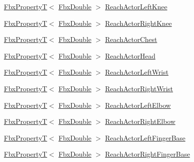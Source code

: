 \begin{DoxyCompactItemize}
\item 
\hyperlink{class_fbx_property_t}{Fbx\+PropertyT}$<$ \hyperlink{fbxtypes_8h_a171e72a1c46fc15c1a6c9c31948c1c5b}{Fbx\+Double} $>$ \hyperlink{class_fbx_character_a85b9f4a0d55767c0af58118459e97129}{Reach\+Actor\+Left\+Knee}
\item 
\hyperlink{class_fbx_property_t}{Fbx\+PropertyT}$<$ \hyperlink{fbxtypes_8h_a171e72a1c46fc15c1a6c9c31948c1c5b}{Fbx\+Double} $>$ \hyperlink{class_fbx_character_a6d6fa21a105a213580ce1e578a6ae1b0}{Reach\+Actor\+Right\+Knee}
\item 
\hyperlink{class_fbx_property_t}{Fbx\+PropertyT}$<$ \hyperlink{fbxtypes_8h_a171e72a1c46fc15c1a6c9c31948c1c5b}{Fbx\+Double} $>$ \hyperlink{class_fbx_character_ad89af6652b384959dbd29e34290bb3fd}{Reach\+Actor\+Chest}
\item 
\hyperlink{class_fbx_property_t}{Fbx\+PropertyT}$<$ \hyperlink{fbxtypes_8h_a171e72a1c46fc15c1a6c9c31948c1c5b}{Fbx\+Double} $>$ \hyperlink{class_fbx_character_abeb245801df829149e54ee3b291a79d4}{Reach\+Actor\+Head}
\item 
\hyperlink{class_fbx_property_t}{Fbx\+PropertyT}$<$ \hyperlink{fbxtypes_8h_a171e72a1c46fc15c1a6c9c31948c1c5b}{Fbx\+Double} $>$ \hyperlink{class_fbx_character_ae5118a968608a6c1a7b786e978583cee}{Reach\+Actor\+Left\+Wrist}
\item 
\hyperlink{class_fbx_property_t}{Fbx\+PropertyT}$<$ \hyperlink{fbxtypes_8h_a171e72a1c46fc15c1a6c9c31948c1c5b}{Fbx\+Double} $>$ \hyperlink{class_fbx_character_a8bf40a85f0b1f63db3b4b35f8f753d81}{Reach\+Actor\+Right\+Wrist}
\item 
\hyperlink{class_fbx_property_t}{Fbx\+PropertyT}$<$ \hyperlink{fbxtypes_8h_a171e72a1c46fc15c1a6c9c31948c1c5b}{Fbx\+Double} $>$ \hyperlink{class_fbx_character_aa87b8af4ec39d88b0fe5ff69c1a9072f}{Reach\+Actor\+Left\+Elbow}
\item 
\hyperlink{class_fbx_property_t}{Fbx\+PropertyT}$<$ \hyperlink{fbxtypes_8h_a171e72a1c46fc15c1a6c9c31948c1c5b}{Fbx\+Double} $>$ \hyperlink{class_fbx_character_aef8163beb5ed38d2f8124f4b9de948c5}{Reach\+Actor\+Right\+Elbow}
\item 
\hyperlink{class_fbx_property_t}{Fbx\+PropertyT}$<$ \hyperlink{fbxtypes_8h_a171e72a1c46fc15c1a6c9c31948c1c5b}{Fbx\+Double} $>$ \hyperlink{class_fbx_character_a7e5392f3362125d4af59a89641f7dd5f}{Reach\+Actor\+Left\+Finger\+Base}
\item 
\hyperlink{class_fbx_property_t}{Fbx\+PropertyT}$<$ \hyperlink{fbxtypes_8h_a171e72a1c46fc15c1a6c9c31948c1c5b}{Fbx\+Double} $>$ \hyperlink{class_fbx_character_af3fcc1f9148d9612c3b3a2b8bcb60a3d}{Reach\+Actor\+Right\+Finger\+Base}

\end{DoxyCompactItemize}

